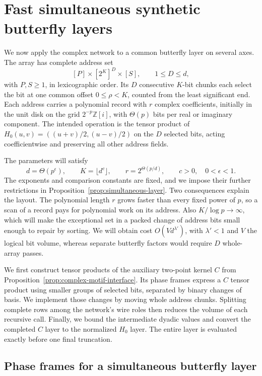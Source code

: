 \section{Fast simultaneous synthetic butterfly layers}
\label{sec:fast-butterfly-layers}

We now apply the complex network to a common butterfly layer on several
axes. The array has complete address set
\[
 [P]\times[2^K]^D\times[S],\qquad 1\le D\le d,
\]
with $P,S\ge1$, in lexicographic order. Its $D$ consecutive $K$-bit
chunks each select the bit at one common offset $0\le\rho<K$, counted
from the least significant
end. Each address carries a polynomial record with $r$ complex
coefficients, initially in the unit disk on the grid
$2^{-p}\mathbb Z[i]$, with $\Theta(p)$ bits per real or imaginary
component. The intended operation is the tensor product
of $H_0(u,v)=((u+v)/2,(u-v)/2)$ on the $D$ selected bits, acting
coefficientwise and preserving all other address fields.

The parameters will satisfy
\[
 d=\Theta(p^\epsilon),\qquad K=\lfloor d^c\rfloor,
 \qquad r=2^{\Theta(p/d)},\qquad c>0,\quad 0<\epsilon<1.
\]
The exponents and comparison constants are fixed, and we impose their
further restrictions in Proposition~\ref{prop:simultaneous-layer}.
Two consequences explain the layout. The polynomial length $r$ grows
faster than every fixed power of $p$, so a scan of a record pays for
polynomial work on its address. Also $K/\log p\to\infty$, which will
make the exceptional set in a packed change of address bits small enough
to repair by sorting. We will obtain cost $O(Vd^{\lambda'})$, with
$\lambda'<1$ and $V$ the logical bit volume, whereas separate butterfly
factors would require $D$ whole-array passes.

We first construct tensor products of the auxiliary two-point kernel
$C$ from Proposition~\ref{prop:complex-motif-interface}. Its phase
frames express a $C$ tensor product using smaller groups of
selected bits, separated by binary changes of basis. We implement those
changes by moving whole address chunks. Splitting complete rows among
the network's wire roles then reduces the volume of each recursive
call. Finally, we bound the intermediate dyadic values and convert the
completed $C$ layer to the normalized $H_0$ layer. The entire layer is
evaluated exactly before one final truncation.

\subsection{Phase frames for a simultaneous butterfly layer}
\label{subsec:phase-frames}

